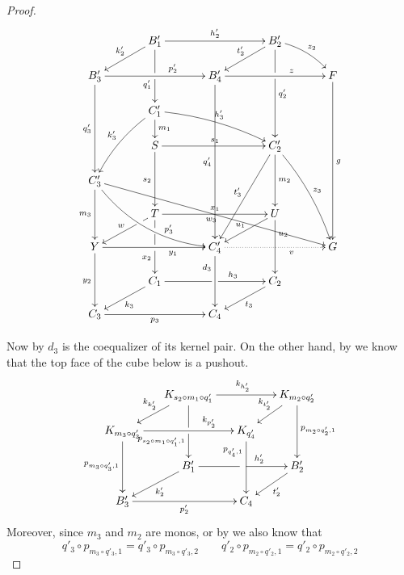 \begin{proof}
\[\xymatrix@C=35pt@R=15pt{& B'_1 \ar[dd]|(.5)\hole_(.62){q'_1}\ar[rr]^{h'_2} \ar[dl]_{k'_2} && B'_2 \ar[ddd]|(.33)\hole^{q'_2} \ar[dl]_{t'_2} \ar@/^.2cm/[dr]^{z_2}\\B'_3 \ar[ddd]_{q'_3} \ar[rr]^(.65){p'_2} && B'_4  \ar[rr]^(.65){z} \ar[ddddd]_{q'_4}&& F \ar[ddddd]^{g}\\& C'_1 \ar@/^.2cm/[drr]^{h'_3} \ar@/_.2cm/[ddl]_{k'_3} \ar[d]^{m_1}\\& S \ar[rr]^{s_1} \ar[dd]_{s_2} && C'_2 \ar[dd]^{m_2} \ar@/^.2cm/[dddr]^{z_3} \ar[lddd]_{t'_3}\\ C'_3 \ar@/_.5cm/[ddrr]^(.65){p'_3} \ar[ddrrrr]_{w_3} \ar[dd]_{m_3}\\&T\ar[dd]|(.25)\hole|\hole_(.65){x_2}\ar[rr]^{x_1} \ar[dl]|(.25)\hole_{w} && U \ar[dd]^(.3){u_2} \ar[dl]_{u_1} \\ Y  \ar[dd]_{y_2}\ar[rr]_(.65){y_1} & & C'_4 \ar@{.>}[rr]_(.65){v} \ar[dd]_(.3){d_3} && G\\&C_1\ar[rr]|\hole^(.65){h_3} \ar[dl]^{k_3} && C_2 \ar[dl]^{t_3} \\C_3 \ar[rr]_{p_3} & & C_4}\]


Now by  $d_3$ is the coequalizer of its kernel pair. On the other hand, by   we know that the top face of the cube below is a pushout.
\[\xymatrix@C=15pt@R=15pt{&K_{s_2\circ m_1\circ q'_1}\ar[dd]|\hole_(.65){p_{s_2\circ m_1\circ q'_1,1}}\ar[rr]^{k_{h'_2}} \ar[dl]_{k_{k'_2}} && K_{m_2\circ q'_2} \ar[dd]^{p_{m_2\circ q'_2,1}} \ar[dl]_{k_{t'_2}} \\ K_{m_3\circ q'_3}  \ar[dd]_{p_{m_3\circ q'_3,1}}\ar[rr]^(.7){k_{p'_2}} & & K_{q'_4} \ar[dd]_(.3){p_{q'_4,1}}\\&B'_1\ar[rr]|\hole^(.65){h'_2} \ar[dl]^{k'_2} && B'_2 \ar[dl]^{t'_2} \\B'_3 \ar[rr]_{p'_2} & & C_4}\]
Moreover, since $m_3$ and $m_2$ are monos, or by  we also know that
\[q'_3\circ p_{m_3\circ q'_3, 1}  = q'_3\circ p_{m_3\circ q'_3,2} \qquad q'_2\circ p_{m_2\circ q'_2, 1}  = q'_2\circ p_{m_2\circ q'_2,2}\]


\end{proof}
